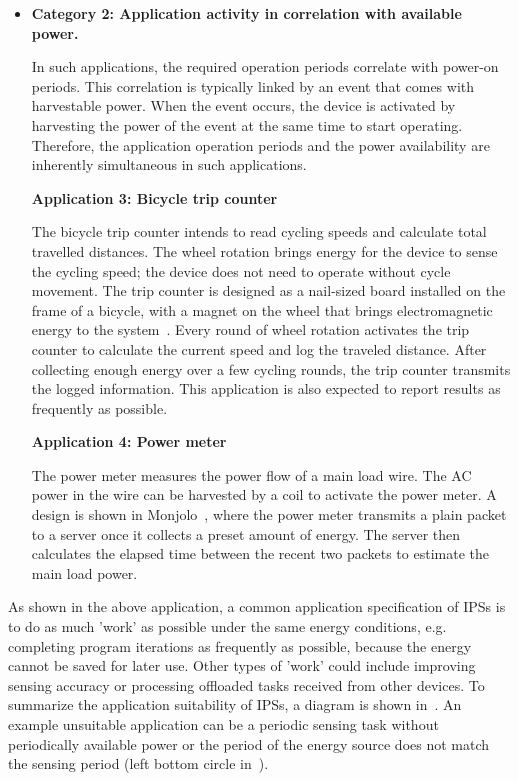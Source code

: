 \begin{itemize}
  \item \textbf{Category 2: Application activity in correlation with available power.}
  
  In such applications, the required operation periods correlate with power-on periods. 
  This correlation is typically linked by an event that comes with harvestable power. 
  When the event occurs, the device is activated by harvesting the power of the event at the same time to start operating. 
  Therefore, the application operation periods and the power availability are inherently simultaneous in such applications. 

  \textbf{Application 3: Bicycle trip counter}

  The bicycle trip counter intends to read cycling speeds and calculate total travelled distances. 
  The wheel rotation brings energy for the device to sense the cycling speed; the device does not need to operate without cycle movement. 
  The trip counter is designed as a nail-sized board installed on the frame of a bicycle, with a magnet on the wheel that brings electromagnetic energy to the system~\cite{bing2018energy}. 
  Every round of wheel rotation activates the trip counter to calculate the current speed and log the traveled distance. 
  After collecting enough energy over a few cycling rounds, the trip counter transmits the logged information. 
  This application is also expected to report results as frequently as possible. 

  \textbf{Application 4: Power meter}

  The power meter measures the power flow of a main load wire. 
  The AC power in the wire can be harvested by a coil to activate the power meter. 
  A design is shown in Monjolo~\cite{debruin2013monjolo}, where the power meter transmits a plain packet to a server once it collects a preset amount of energy. 
  The server then calculates the elapsed time between the recent two packets to estimate the main load power. 

\end{itemize}
  
As shown in the above application, a common application specification of IPSs is to do as much 'work' as possible under the same energy conditions, e.g. completing program iterations as frequently as possible, because the energy cannot be saved for later use. 
Other types of 'work' could include improving sensing accuracy or processing offloaded tasks received from other devices. 
To summarize the application suitability of IPSs, a diagram is shown in~. 
An example unsuitable application can be a periodic sensing task without periodically available power or the period of the energy source does not match the sensing period (left bottom circle in~).

